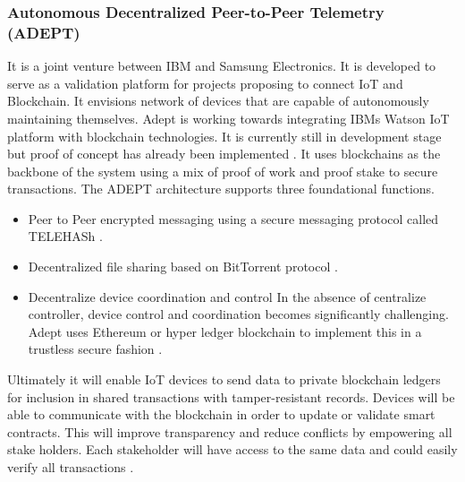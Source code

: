 \subsubsection{Autonomous Decentralized Peer-to-Peer Telemetry (ADEPT)} \label{Adept}
It is a joint venture between IBM and Samsung Electronics. It is developed to serve as a validation platform for projects proposing to connect IoT and Blockchain. It envisions network of devices that are capable of autonomously maintaining themselves. Adept is working towards integrating IBMs Watson IoT platform with blockchain technologies. It is currently still in development stage but proof of concept has already been implemented \cite{misc:005}. It uses blockchains as the backbone of the system using a mix of proof of work and proof stake to secure transactions. The ADEPT architecture supports three foundational functions.
\begin{itemize}
  \item Peer to Peer encrypted messaging using a secure messaging protocol called TELEHASh \cite{misc:005}.
  \item Decentralized file sharing based on BitTorrent protocol \cite{misc:005}.
\item Decentralize device coordination and control
In the absence of centralize controller, device control and coordination becomes significantly challenging. Adept uses Ethereum or hyper ledger blockchain to implement this in a trustless secure fashion \cite{misc:005}.

\end{itemize}
Ultimately it will enable IoT devices to send data to private blockchain ledgers for inclusion in shared transactions with tamper-resistant records. Devices will be able to communicate with the blockchain in order to update or validate smart contracts. This will improve transparency and reduce conflicts by empowering all stake holders. Each stakeholder will have access to the same data and could easily verify all transactions \cite{misc:005} \cite{misc:004}. 
\clearpage


